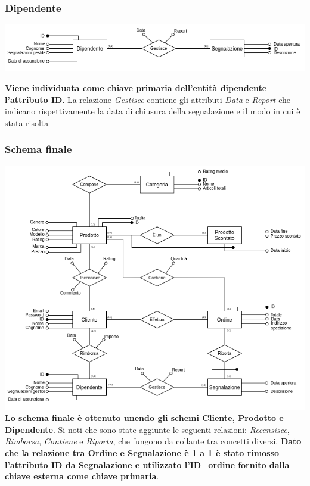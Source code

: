 \subsubsection{Dipendente}
\begin{center}
\includegraphics[scale=0.60]{images/segnalazione.png}
\end{center}
\textbf{Viene individuata come chiave primaria dell'entità dipendente l'attributo ID}. La relazione \textit{Gestisce} contiene gli attributi \textit{Data} e \textit{Report} che indicano rispettivamente la data di chiusura della segnalazione e il modo in cui è stata risolta
\subsubsection{Schema finale}
\includegraphics[scale=0.55]{images/schema_finale.png}
\textbf{Lo schema finale è ottenuto unendo gli schemi Cliente, Prodotto e Dipendente}. Si noti che sono state aggiunte le seguenti relazioni: \textit{Recensisce}, \textit{Rimborsa}, \textit{Contiene} e \textit{Riporta}, che fungono da collante tra concetti diversi. \textbf{Dato che la relazione tra Ordine e Segnalazione è 1 a 1 è stato rimosso l'attributo ID da Segnalazione e utilizzato l'ID\_ordine fornito dalla chiave esterna come chiave primaria}.
